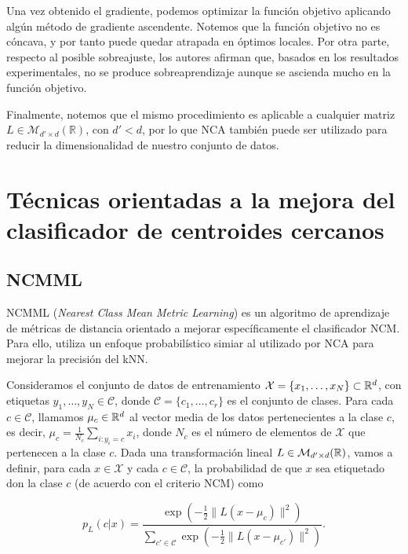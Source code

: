 Una vez obtenido el gradiente, podemos optimizar la función objetivo aplicando algún método de gradiente ascendente. Notemos que la función objetivo no es cóncava, y por tanto puede quedar atrapada en óptimos locales. Por otra parte, respecto al posible sobreajuste, los autores afirman que, basados en los resultados experimentales, no se produce sobreaprendizaje aunque se ascienda mucho en la función objetivo.

Finalmente, notemos que el mismo procedimiento es aplicable a cualquier matriz $L \in \mathcal{M}_{d'\times d}(\mathbb{R})$, con $d' < d$, por lo que NCA también puede ser utilizado para reducir la dimensionalidad de nuestro conjunto de datos.


\section{Técnicas orientadas a la mejora del clasificador de centroides cercanos}

\subsection{NCMML}

NCMML (\emph{Nearest Class Mean Metric Learning}) \cite{ncmml} es un algoritmo de aprendizaje de métricas de distancia orientado a mejorar específicamente el clasificador NCM. Para ello, utiliza un enfoque probabilístico simiar al utilizado por NCA para mejorar la precisión del kNN.

Consideramos el conjunto de datos de entrenamiento $\mathcal{X} = \{x_1,\dots,x_N\} \subset \mathbb{R}^d$, con etiquetas $y_1,\dots,y_N \in \mathcal{C}$, donde $\mathcal{C} = \{c_1,\dots,c_r\}$ es el conjunto de clases. Para cada $c \in \mathcal{C}$, llamamos $\mu_c \in \mathbb{R}^d$ al vector media de los datos pertenecientes a la clase $c$, es decir, $\mu_c = \frac{1}{N_c}\sum_{i\colon y_i = c}x_i$, donde $N_c$ es el número de elementos de $\mathcal{X}$ que pertenecen a la clase $c$. Dada una transformación lineal $L \in \mathcal{M}_{d'\times d}(\mathbb{R})$, vamos a definir, para cada $x \in \mathcal{X}$ y cada $c \in \mathcal{C}$, la probabilidad de que $x$ sea etiquetado don la clase $c$ (de acuerdo con el criterio NCM) como

\begin{equation}
    p_L(c|x) = \frac{\exp\left(-\frac{1}{2} \|L(x - \mu_c)\|^2\right)}{\sum\limits_{c' \in \mathcal{C}} \exp\left(-\frac{1}{2} \|L(x - \mu_{c'})\|^2\right)}.
\end{equation} 

